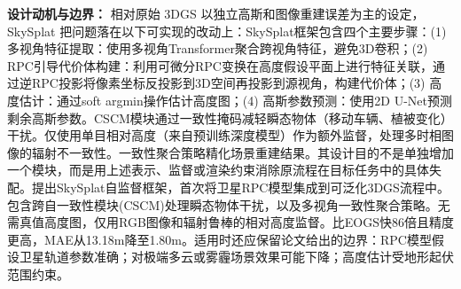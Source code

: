 \textbf{设计动机与边界：} 相对原始 3DGS 以独立高斯和图像重建误差为主的设定，SkySplat 把问题落在以下可实现的改动上：SkySplat框架包含四个主要步骤：(1) 多视角特征提取：使用多视角Transformer聚合跨视角特征，避免3D卷积；(2) RPC引导代价体构建：利用可微分RPC变换在高度假设平面上进行特征关联，通过逆RPC投影将像素坐标反投影到3D空间再投影到源视角，构建代价体；(3) 高度估计：通过soft argmin操作估计高度图；(4) 高斯参数预测：使用2D U-Net预测剩余高斯参数。CSCM模块通过一致性掩码减轻瞬态物体（移动车辆、植被变化）干扰。仅使用单目相对高度（来自预训练深度模型）作为额外监督，处理多时相图像的辐射不一致性。一致性聚合策略精化场景重建结果。其设计目的不是单独增加一个模块，而是用上述表示、监督或渲染约束消除原流程在目标任务中的具体失配。提出SkySplat自监督框架，首次将卫星RPC模型集成到可泛化3DGS流程中。包含跨自一致性模块(CSCM)处理瞬态物体干扰，以及多视角一致性聚合策略。无需真值高度图，仅用RGB图像和辐射鲁棒的相对高度监督。比EOGS快86倍且精度更高，MAE从13.18m降至1.80m。适用时还应保留论文给出的边界：RPC模型假设卫星轨道参数准确；对极端多云或雾霾场景效果可能下降；高度估计受地形起伏范围约束。
